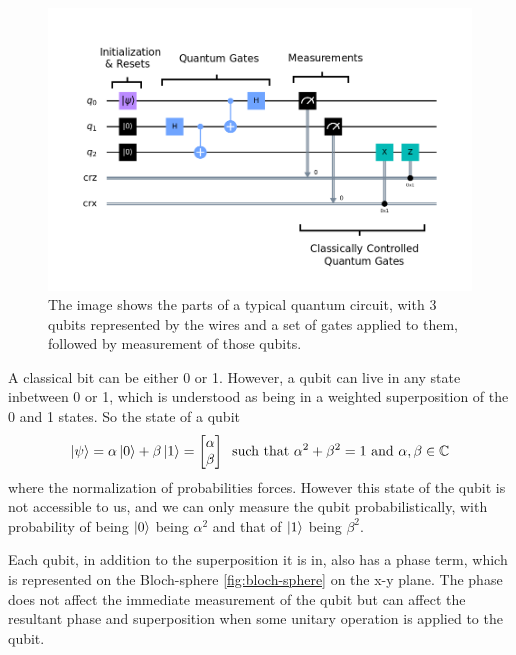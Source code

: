 \begin{figure}[ht]
    \centering
    \includegraphics[width=0.8\linewidth]{figures/quantum/quantum_circuit_example.png}
    \caption[Typical Quantum Circuit]{The image shows the parts of a typical quantum circuit, with 3 qubits represented by the wires and a set of gates applied to them, followed by measurement of those qubits.}
    \label{fig:quantum-circuit-example}
\end{figure}


A classical bit can be either 0 or 1. However, a qubit can live in any state inbetween 0 or 1, which is understood as being in a weighted superposition of the 0 and 1 states. So the state of a qubit 
\begin{equation}
    \ket{\psi} = \alpha \ket{0} + \beta \ket{1} = \begin{bmatrix}\alpha \\ \beta\end{bmatrix} \;\;\text{such that }\alpha^2 + \beta^2 = 1 \text{ and } \alpha, \beta \in \mathbb{C}
\end{equation}
where the normalization of probabilities forces. However this state of the qubit is not accessible to us, and we can only measure the qubit probabilistically, with probability of being $\ket{0}$ being $\alpha^2$ and that of $\ket{1}$ being $\beta^2$.

Each qubit, in addition to the superposition it is in, also has a phase term, which is represented on the Bloch-sphere \ref{fig:bloch-sphere} on the x-y plane. The phase does not affect the immediate measurement of the qubit but can affect the resultant phase and superposition when some unitary operation is applied to the qubit.


